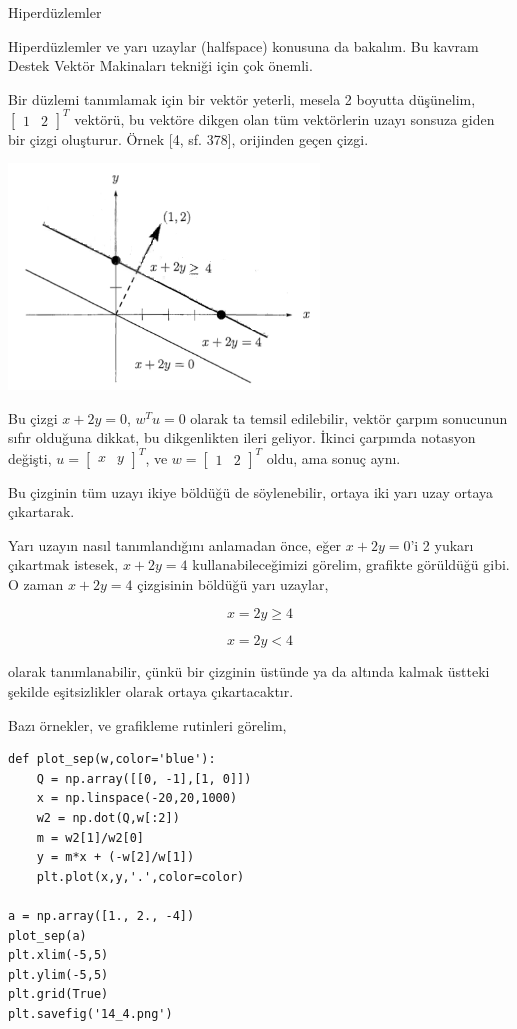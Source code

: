 \documentclass[12pt,fleqn]{article}\usepackage{../../common}
\begin{document}
Hiperdüzlemler

Hiperdüzlemler ve yarı uzaylar (halfspace) konusuna da bakalım. Bu kavram
Destek Vektör Makinaları tekniği için çok önemli.

Bir düzlemi tanımlamak için bir vektör yeterli, mesela 2 boyutta düşünelim,
$\left[\begin{array}{cc}1 & 2 \end{array}\right]^T$ vektörü, bu vektöre
dikgen olan tüm vektörlerin uzayı sonsuza giden bir çizgi oluşturur. Örnek
[4, sf. 378], orijinden geçen çizgi.

\includegraphics[height=6cm]{vision_40lines_02.png}

Bu çizgi $x + 2y = 0$, $w^Tu = 0 $ olarak ta temsil edilebilir, vektör çarpım
sonucunun sıfır olduğuna dikkat, bu dikgenlikten ileri geliyor. İkinci çarpımda
notasyon değişti, $u = \left[\begin{array}{cc}x & y \end{array}\right]^T$, ve $w
= \left[\begin{array}{cc}1 & 2 \end{array}\right]^T$ oldu, ama sonuç aynı.

Bu çizginin tüm uzayı ikiye böldüğü de söylenebilir, ortaya iki yarı uzay ortaya
çıkartarak.

Yarı uzayın nasıl tanımlandığını anlamadan önce, eğer $x + 2y = 0$'i 2 yukarı
çıkartmak istesek, $x + 2y = 4$ kullanabileceğimizi görelim, grafikte görüldüğü
gibi. O zaman $x + 2y = 4$ çizgisinin böldüğü yarı uzaylar,

$$ x = 2y \ge 4  $$

$$ x = 2y < 4  $$

olarak tanımlanabilir, çünkü bir çizginin üstünde ya da altında kalmak üstteki
şekilde eşitsizlikler olarak ortaya çıkartacaktır.

Bazı örnekler, ve grafikleme rutinleri görelim,

\begin{verbatim}
def plot_sep(w,color='blue'):
    Q = np.array([[0, -1],[1, 0]])
    x = np.linspace(-20,20,1000)
    w2 = np.dot(Q,w[:2])
    m = w2[1]/w2[0]
    y = m*x + (-w[2]/w[1])
    plt.plot(x,y,'.',color=color)

a = np.array([1., 2., -4])
plot_sep(a)
plt.xlim(-5,5)
plt.ylim(-5,5)
plt.grid(True)
plt.savefig('14_4.png')
\end{verbatim}
\end{document}
